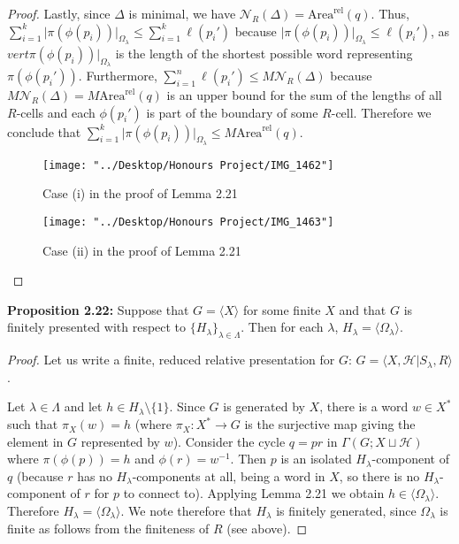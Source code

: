\documentclass[12pt]{article}
\newcommand{\vs}{\vskip10pt}
\begin{document}
\begin{proof}
		\vs 
		
		Lastly, since $\Delta$ is minimal, we have $\mathcal{N}_R(\Delta) = \text{Area}^{\text{rel}}(q)$. Thus, $\sum_{i=1}^k \vert \pi(\phi(p_i)) \vert_{\Omega_{\lambda}} \leq \sum_{i=1}^k \ell(p_i')$ because $\vert \pi(\phi(p_i)) \vert_{\Omega_\lambda} \leq \ell(p_i')$, as $vert \pi(\phi(p_i)) \vert_{\Omega_\lambda}$ is the length of the shortest possible word representing $\pi(\phi(p_i'))$. Furthermore, $\sum_{i=1}^n \ell(p_i') \leq M \mathcal{N}_R (\Delta)$ because $M \mathcal{N}_R (\Delta) = M \text{Area}^{\text{rel}}(q)$ is an upper bound for the sum of the lengths of all $R$-cells and each $\phi(p_i')$ is part of the boundary of some $R$-cell. Therefore we conclude that $\sum_{i=1}^k \vert \pi(\phi(p_i)) \vert_{\Omega_{\lambda}} \leq M \text{Area}^{\text{rel}}(q)$. 
		
\begin{figure} [H]
	\centering
	\texttt{[image: "../Desktop/Honours Project/IMG\_1462"]}
	\caption{Case (i) in the proof of Lemma 2.21}
	\label{fig:img1462}
\end{figure}

\begin{figure} [H]
	\centering
	\texttt{[image: "../Desktop/Honours Project/IMG\_1463"]}
	\caption{Case (ii) in the proof of Lemma 2.21}
	\label{fig:img1463}
\end{figure}

		
	\end{proof}  

	\textbf{Proposition 2.22: } Suppose that $G = \langle X \rangle$ for some finite $X$ and that $G$ is finitely presented with respect to $\{H_{\lambda}\}_{\lambda \in \Lambda}$. Then for each $\lambda$, $H_{\lambda} = \langle \Omega_{\lambda} \rangle$. 
	
	\begin{proof}
		
		Let us write a finite, reduced relative presentation for $G$: $G = \langle X, \mathcal{H} \vert S_{\lambda}, R \rangle$. 
		
		\vs 
		
		Let $\lambda \in \Lambda$ and let $h \in H_{\lambda} \setminus \{1\}$. Since $G$ is generated by $X$, there is a word $w \in X^*$ such that $\pi_X(w) = h$ (where $\pi_X: X^* \rightarrow G$ is the surjective map giving the element in $G$ represented by $w$). Consider the cycle $q = pr$ in $\Gamma(G; X \sqcup \mathcal{H})$ where $\pi(\phi(p)) = h$ and $\phi(r) = w^{-1}$. Then $p$ is an isolated $H_{\lambda}$-component of $q$ (because $r$ has no $H_{\lambda}$-components at all, being a word in $X$, so there is no $H_{\lambda}$-component of $r$ for $p$ to connect to). Applying Lemma 2.21 we obtain $h \in \langle \Omega_{\lambda} \rangle$. Therefore $H_{\lambda} = \langle \Omega_{\lambda} \rangle$. We note therefore that $H_{\lambda}$ is finitely generated, since $\Omega_{\lambda}$ is finite as follows from the finiteness of $R$ (see above). 
		
	\end{proof}
\end{document}
